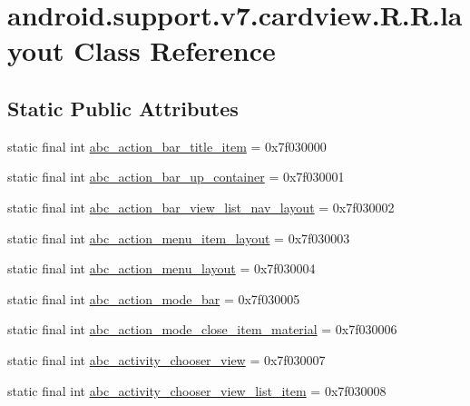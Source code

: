 \hypertarget{classandroid_1_1support_1_1v7_1_1cardview_1_1_r_1_1layout}{
\section{android.support.v7.cardview.R.R.layout Class Reference}
\label{classandroid_1_1support_1_1v7_1_1cardview_1_1_r_1_1layout}
}
\subsection*{Static Public Attributes}
\begin{CompactItemize}
\item 
static final int \hyperlink{classandroid_1_1support_1_1v7_1_1cardview_1_1_r_1_1layout_d4f53c1a492ae37a965ee9d63e108cfb}{abc\_\-action\_\-bar\_\-title\_\-item} = 0x7f030000
\item 
static final int \hyperlink{classandroid_1_1support_1_1v7_1_1cardview_1_1_r_1_1layout_191583ad532c4735d5b403ea8683c317}{abc\_\-action\_\-bar\_\-up\_\-container} = 0x7f030001
\item 
static final int \hyperlink{classandroid_1_1support_1_1v7_1_1cardview_1_1_r_1_1layout_0eda785ad706d674e26b8c93d731ac62}{abc\_\-action\_\-bar\_\-view\_\-list\_\-nav\_\-layout} = 0x7f030002
\item 
static final int \hyperlink{classandroid_1_1support_1_1v7_1_1cardview_1_1_r_1_1layout_5da8a33c13ec90ebfa627c0d59d3d29b}{abc\_\-action\_\-menu\_\-item\_\-layout} = 0x7f030003
\item 
static final int \hyperlink{classandroid_1_1support_1_1v7_1_1cardview_1_1_r_1_1layout_424983a98b0b3d7b6591f78f13f71afe}{abc\_\-action\_\-menu\_\-layout} = 0x7f030004
\item 
static final int \hyperlink{classandroid_1_1support_1_1v7_1_1cardview_1_1_r_1_1layout_4b7de458739b8964e16b187da3c078da}{abc\_\-action\_\-mode\_\-bar} = 0x7f030005
\item 
static final int \hyperlink{classandroid_1_1support_1_1v7_1_1cardview_1_1_r_1_1layout_f89e86a5b57c146241c4094da23d9801}{abc\_\-action\_\-mode\_\-close\_\-item\_\-material} = 0x7f030006
\item 
static final int \hyperlink{classandroid_1_1support_1_1v7_1_1cardview_1_1_r_1_1layout_6caaa82f2eb89e2e660d9834d9d6a937}{abc\_\-activity\_\-chooser\_\-view} = 0x7f030007
\item 
static final int \hyperlink{classandroid_1_1support_1_1v7_1_1cardview_1_1_r_1_1layout_85de344222ddee5059239d282ce1cc06}{abc\_\-activity\_\-chooser\_\-view\_\-list\_\-item} = 0x7f030008

\end{CompactItemize}
